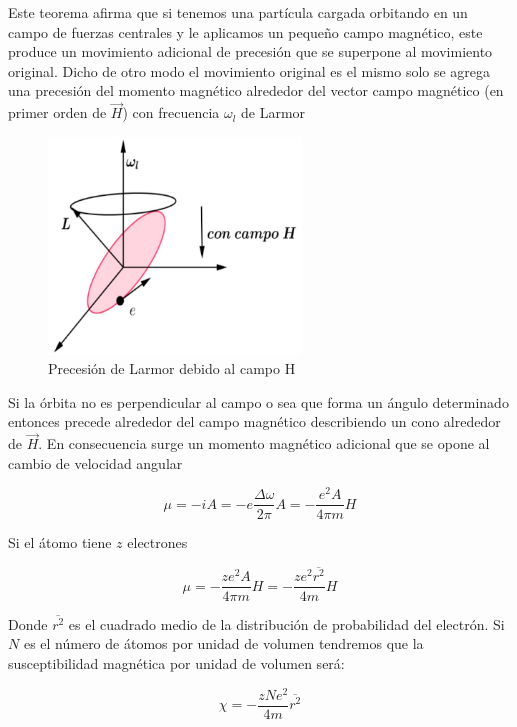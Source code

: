 Este teorema afirma que si tenemos una partícula cargada orbitando en un campo de fuerzas centrales y le aplicamos un pequeño campo magnético, este produce un movimiento adicional de precesión que se superpone al movimiento original. Dicho de otro modo el movimiento original es el mismo solo se agrega una precesión del momento magnético alrededor del vector campo magnético (en primer orden de $\overrightarrow{H}$) con frecuencia $\omega_{l}$ de Larmor

\begin{figure}[H]
    \centering
    \includegraphics[width=0.6\textwidth]{./Figures/Larmor2}
	\caption{Precesión de Larmor debido al campo H}
	\label{fig:Larmor2}
\end{figure}


Si la órbita no es perpendicular al campo o sea que forma un ángulo determinado entonces precede alrededor del campo magnético describiendo un cono alrededor de $\overrightarrow{H}$. En consecuencia surge un momento magnético adicional que se opone al cambio de velocidad angular

\begin{equation}
  \mu= -iA = -e \frac{\Delta\omega}{2\pi}A = -\frac{e^{2}A}{4\pi m} H
\end{equation}

Si el átomo tiene $z$ electrones

\begin{equation}
  \mu= -\frac{z e^{2}A}{4\pi m} H = -\frac{z e^{2} \overline{r^{2}}}{4m} H
\end{equation}

Donde $\overline{r^{2}}$ es el cuadrado medio de la distribución de probabilidad del electrón. Si $N$ es el número de átomos por unidad de volumen tendremos que la susceptibilidad magnética por unidad de volumen será:

\begin{equation}
  \chi= -\frac{z N e^{2}}{4m} \overline{r^{2}}
\end{equation}

